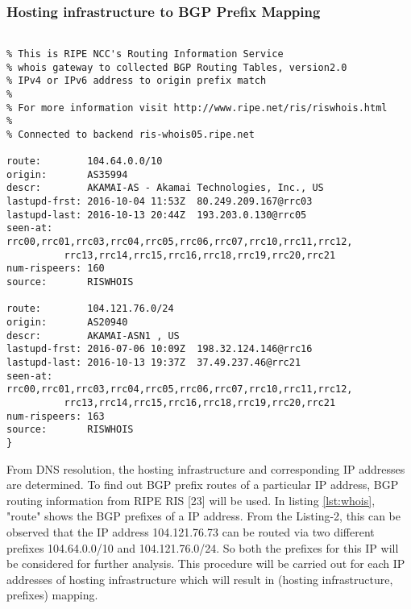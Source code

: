 \subsubsection{Hosting infrastructure to BGP Prefix Mapping}
\begin{lstlisting}[caption= RIPE RIS bgp prefixes using whois command, label=lst:whois]

% This is RIPE NCC's Routing Information Service
% whois gateway to collected BGP Routing Tables, version2.0
% IPv4 or IPv6 address to origin prefix match
%
% For more information visit http://www.ripe.net/ris/riswhois.html
%
% Connected to backend ris-whois05.ripe.net

route:        104.64.0.0/10
origin:       AS35994
descr:        AKAMAI-AS - Akamai Technologies, Inc., US
lastupd-frst: 2016-10-04 11:53Z  80.249.209.167@rrc03
lastupd-last: 2016-10-13 20:44Z  193.203.0.130@rrc05
seen-at:      rrc00,rrc01,rrc03,rrc04,rrc05,rrc06,rrc07,rrc10,rrc11,rrc12,
	      rrc13,rrc14,rrc15,rrc16,rrc18,rrc19,rrc20,rrc21
num-rispeers: 160
source:       RISWHOIS

route:        104.121.76.0/24
origin:       AS20940
descr:        AKAMAI-ASN1 , US
lastupd-frst: 2016-07-06 10:09Z  198.32.124.146@rrc16
lastupd-last: 2016-10-13 19:37Z  37.49.237.46@rrc21
seen-at:      rrc00,rrc01,rrc03,rrc04,rrc05,rrc06,rrc07,rrc10,rrc11,rrc12,
	      rrc13,rrc14,rrc15,rrc16,rrc18,rrc19,rrc20,rrc21
num-rispeers: 163
source:       RISWHOIS
}
\end{lstlisting}

\noindent From DNS resolution, the hosting infrastructure and corresponding IP addresses are determined. To find out BGP prefix routes of a particular IP address, BGP routing information from RIPE RIS [23] will be used. In listing \ref{lst:whois}, "route" shows the BGP prefixes of a IP address. From the Listing-2, this can be observed that the IP address 104.121.76.73 can be routed via two different prefixes 104.64.0.0/10 and 104.121.76.0/24. So both the prefixes for this IP will be considered for further analysis. This procedure will be carried out for each IP addresses of hosting infrastructure which will result in (hosting infrastructure, prefixes) mapping.\\

